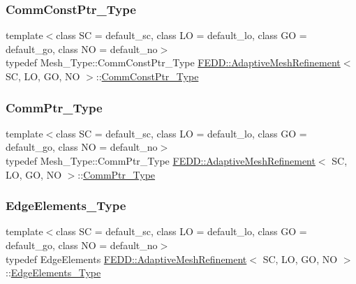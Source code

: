 \subsubsection{\texorpdfstring{Comm\+Const\+Ptr\+\_\+\+Type}{CommConstPtr\_Type}}
{\footnotesize\ttfamily template$<$class SC  = default\+\_\+sc, class LO  = default\+\_\+lo, class GO  = default\+\_\+go, class NO  = default\+\_\+no$>$ \\
typedef Mesh\+\_\+\+Type\+::\+Comm\+Const\+Ptr\+\_\+\+Type \hyperlink{classFEDD_1_1AdaptiveMeshRefinement}{F\+E\+D\+D\+::\+Adaptive\+Mesh\+Refinement}$<$ SC, LO, GO, NO $>$\+::\hyperlink{classFEDD_1_1AdaptiveMeshRefinement_a6bd5089532bd8dac39bebc4a92e33c40}{Comm\+Const\+Ptr\+\_\+\+Type}}

\mbox{\label{classFEDD_1_1AdaptiveMeshRefinement_a28759ffaba5c0900ad9ad3b7b185d504}} 
\subsubsection{\texorpdfstring{Comm\+Ptr\+\_\+\+Type}{CommPtr\_Type}}
{\footnotesize\ttfamily template$<$class SC  = default\+\_\+sc, class LO  = default\+\_\+lo, class GO  = default\+\_\+go, class NO  = default\+\_\+no$>$ \\
typedef Mesh\+\_\+\+Type\+::\+Comm\+Ptr\+\_\+\+Type \hyperlink{classFEDD_1_1AdaptiveMeshRefinement}{F\+E\+D\+D\+::\+Adaptive\+Mesh\+Refinement}$<$ SC, LO, GO, NO $>$\+::\hyperlink{classFEDD_1_1AdaptiveMeshRefinement_a28759ffaba5c0900ad9ad3b7b185d504}{Comm\+Ptr\+\_\+\+Type}}

\mbox{\label{classFEDD_1_1AdaptiveMeshRefinement_a891870bd161746dd633e1c8126d8fea1}} 
\subsubsection{\texorpdfstring{Edge\+Elements\+\_\+\+Type}{EdgeElements\_Type}}
{\footnotesize\ttfamily template$<$class SC  = default\+\_\+sc, class LO  = default\+\_\+lo, class GO  = default\+\_\+go, class NO  = default\+\_\+no$>$ \\
typedef Edge\+Elements \hyperlink{classFEDD_1_1AdaptiveMeshRefinement}{F\+E\+D\+D\+::\+Adaptive\+Mesh\+Refinement}$<$ SC, LO, GO, NO $>$\+::\hyperlink{classFEDD_1_1AdaptiveMeshRefinement_a891870bd161746dd633e1c8126d8fea1}{Edge\+Elements\+\_\+\+Type}}

